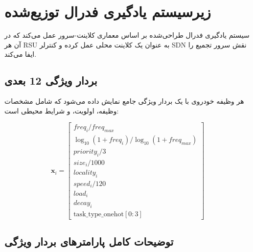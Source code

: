 \documentclass[11pt]{article}
\begin{document}
\section{زیرسیستم یادگیری فدرال توزیع‌شده}

سیستم یادگیری فدرال طراحی‌شده بر اساس معماری کلاینت-سرور عمل می‌کند که در آن هر RSU به عنوان یک کلاینت محلی عمل کرده و کنترلر SDN نقش سرور تجمیع را ایفا می‌کند.

\subsection{بردار ویژگی 12 بعدی}

هر وظیفه خودروی با یک بردار ویژگی جامع نمایش داده می‌شود که شامل مشخصات وظیفه، اولویت، و شرایط محیطی است:

\begin{equation}
\mathbf{x}_i = \begin{bmatrix}
freq_i / freq_{max} \\
\log_{10}(1 + freq_i) / \log_{10}(1 + freq_{max}) \\
priority_i / 3 \\
size_i / 1000 \\
locality_i \\
speed_i / 120 \\
load_i \\
decay_i \\
\text{task\_type\_onehot}[0:3]
\end{bmatrix}
\label{eq:feature_vector}
\end{equation}

\subsection{توضیحات کامل پارامترهای بردار ویژگی}
\end{document}

